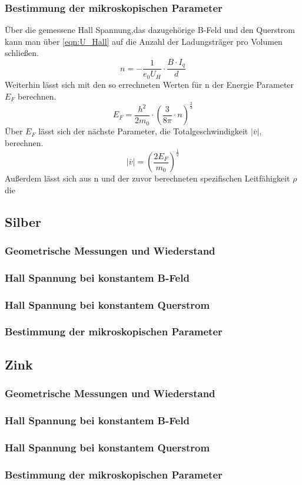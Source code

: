 \subsubsection{Bestimmung der mikroskopischen Parameter}
Über die gemessene Hall Spannung,das dazugehörige B-Feld und den Querstrom kann man über \ref{eqn:U_Hall} auf die Anzahl der Ladungsträger pro Volumen schließen.
\begin{equation*}
    n = -\frac{1}{e_0 U_H}\cdot \frac{B\cdot I_q}{d}
\end{equation*}
Weiterhin lässt sich mit den so errechneten Werten für n der Energie Parameter $E_F$ berechnen.
\begin{equation*}
    E_F = \frac{h^2}{2 m_0}\cdot (\frac{3}{8\pi}\cdot n )^{\frac{2}{3}}
\end{equation*}
Über $E_F$ lässt sich der nächste Parameter, die Totalgeschwindigkeit $|\bar{v}|$, berechnen.
\begin{equation*}
    |\bar{v}| = (\frac{2 E_F}{m_0})^{\frac{1}{2}}
\end{equation*}
Außerdem lässt sich aus n und der zuvor berechneten spezifischen Leitfähigkeit $\rho$ die
\subsection{Silber}
\subsubsection{Geometrische Messungen und Wiederstand}
\subsubsection{Hall Spannung bei konstantem B-Feld}
\subsubsection{Hall Spannung bei konstantem Querstrom}
\subsubsection{Bestimmung der mikroskopischen Parameter}
\subsection{Zink}
\subsubsection{Geometrische Messungen und Wiederstand}
\subsubsection{Hall Spannung bei konstantem B-Feld}
\subsubsection{Hall Spannung bei konstantem Querstrom}
\subsubsection{Bestimmung der mikroskopischen Parameter}
\label{sec:Auswertung}
